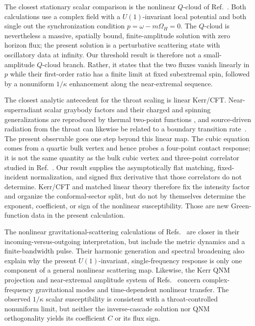\documentclass[aps,prd,twocolumn,10pt,nofootinbib,superscriptaddress,floatfix]{revtex4-2}
\begin{document}
The closest stationary scalar comparison is the nonlinear $Q$-cloud of
Ref.~\cite{HerdeiroQCloud2014}.  Both calculations use a complex field with a
$U(1)$-invariant local potential and both single out the synchronization
condition $p=\omega-m\Omega_H=0$.  The $Q$-cloud is nevertheless a massive,
spatially bound, finite-amplitude solution with zero horizon flux; the present
solution is a perturbative scattering state with oscillatory data at infinity.
Our threshold result is therefore not a small-amplitude $Q$-cloud branch.
Rather, it states that the two fluxes vanish linearly in $p$ while their
first-order ratio has a finite limit at fixed subextremal spin, followed by a
nonuniform $1/\kappa$ enhancement along the near-extremal sequence.

The closest analytic antecedent for the throat scaling is linear Kerr/CFT.
Near-superradiant scalar graybody factors and their charged and spinning
generalizations are reproduced by thermal two-point functions
\cite{BredbergKerrCFT2010,HartmanKerrCFT2010,CastroHiddenCFT2010}, and
source-driven radiation from the throat can likewise be related to a boundary
transition rate~\cite{PorfyriadisKerrCFT2014}.  The present observable goes one
step beyond this linear map.  The cubic equation comes from a quartic bulk
vertex and hence probes a four-point contact response; it is not the same
quantity as the bulk cubic vertex and three-point correlator studied in
Ref.~\cite{BeckerKerrCFT2011}.  Our result supplies the asymptotically flat
matching, fixed-incident normalization, and signed flux derivative that those
correlators do not determine.  Kerr/CFT and matched linear theory therefore
fix the intensity factor and organize the conformal-sector split, but do not
by themselves determine the exponent, coefficient, or sign of the nonlinear
susceptibility.  Those are new Green-function data in the present calculation.

The nonlinear gravitational-scattering calculations of
Refs.~\cite{Zlochower2003,Frauendiener2021,Frauendiener2025,Cardoso2026}
are closer in their incoming-versus-outgoing interpretation, but include the
metric dynamics and a finite-bandwidth pulse.  Their harmonic generation and
spectral broadening also explain why the present $U(1)$-invariant,
single-frequency response is only one component of a general nonlinear
scattering map.  Likewise, the Kerr QNM projection and near-extremal amplitude
system of Refs.~\cite{GreenEtAl2023,Iuliano2025} concern complex-frequency
gravitational modes and time-dependent nonlinear transfer.  The observed
$1/\kappa$ scalar susceptibility is consistent with a throat-controlled
nonuniform limit, but neither the inverse-cascade solution nor QNM
orthogonality yields its coefficient $C$ or its flux sign.
\end{document}
